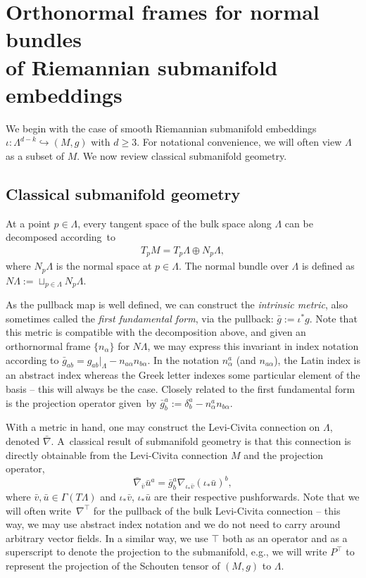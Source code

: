 \documentclass[10pt,a4paper]{article}
\numberwithin{equation}{section}
\renewcommand{\=}{\stackrel \Lambda =}
\begin{document}
\section[Orthonormal frames for normal bundles of Riemannian submanifold embeddings]{Orthonormal frames for normal bundles \\ of Riemannian submanifold embeddings} \label{riem-frames}

We begin with the case of smooth Riemannian submanifold embeddings $\iota \colon \Lambda^{d-k} \hookrightarrow (M,g)$ with $d \geq 3$. For notational convenience, we will often view $\Lambda$ as a subset of $M$. We now review classical submanifold geometry.

\subsection{Classical submanifold geometry}

 At a point $p \in \Lambda$, every tangent space of the bulk space along $\Lambda$ can be decomposed according~to
\begin{align} \label{TM-decomp}
T_p M = T_p \Lambda \oplus N_p \Lambda ,
\end{align}
where $N_p \Lambda$ is the normal space at $p \in \Lambda$. The normal bundle over $\Lambda$ is defined as $N \Lambda := \sqcup_{p \in \Lambda} N_p \Lambda$.

As the pullback map is well defined, we can construct the \textit{intrinsic metric}, also sometimes called the \textit{first fundamental form}, via the pullback: $\bar{g} := \iota^* g$. Note that this metric is compatible with the decomposition above, and given an orthornormal frame $\{n_{\alpha}\}$ for $N \Lambda$, we may express this invariant in index notation according to $\bar{g}_{ab} = g_{ab}|_{\Lambda} - n_{a \alpha} n_{b \alpha}$. In the notation $n^a_{\alpha}$ (and $n_{a \alpha}$), the Latin index is an abstract index whereas the Greek letter indexes some particular element of the basis -- this will always be the case. Closely related to the first fundamental form is the projection operator given~by $\bar{g}^a_b := \delta^a_b - n^a_{\alpha} n_{b \alpha}$.

With a metric in hand, one may construct the Levi-Civita connection on $\Lambda$, denoted $\bar{\nabla}$. A~classical result of submanifold geometry is that this connection is directly obtainable from the Levi-Civita connection $M$ and the projection operator,
\[
\bar{\nabla}_{\bar v} \bar{u}^a = \bar{g}^a_b \nabla_{\iota_* \bar{v}} (\iota_* \bar{u})^b ,
\]
where $\bar{v},\bar{u} \in \Gamma(T \Lambda)$ and $\iota_* \bar{v}$, $\iota_* \bar{u}$ are their respective pushforwards. Note that we will often write~$\nabla^\top$ for the pullback of the bulk Levi-Civita connection -- this way, we may use abstract index notation and we do not need to carry around arbitrary vector fields. In a similar way, we use $\top$ both as an operator and as a superscript to denote the projection to the submanifold, e.g., we will write $P^\top$ to represent the projection of the Schouten tensor of $(M,g)$ to $\Lambda$.
\end{document}
